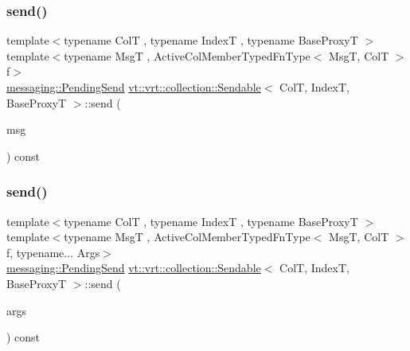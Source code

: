\mbox{\label{structvt_1_1vrt_1_1collection_1_1_sendable_aa8c102820895d01422c14e8c0993fc90}} 
\subsubsection{\texorpdfstring{send()}{send()}\hspace{0.1cm}{\footnotesize\ttfamily [2/6]}}
{\footnotesize\ttfamily template$<$typename ColT , typename IndexT , typename Base\+ProxyT $>$ \\
template$<$typename MsgT , Active\+Col\+Member\+Typed\+Fn\+Type$<$ Msg\+T, Col\+T $>$ f$>$ \\
\hyperlink{structvt_1_1messaging_1_1_pending_send}{messaging\+::\+Pending\+Send} \hyperlink{structvt_1_1vrt_1_1collection_1_1_sendable}{vt\+::vrt\+::collection\+::\+Sendable}$<$ ColT, IndexT, Base\+ProxyT $>$\+::send (\begin{DoxyParamCaption}\item[{\hyperlink{namespacevt_ab2b3d506ec8e8d1540aede826d84a239}{Msg\+Shared\+Ptr}$<$ MsgT $>$}]{msg }\end{DoxyParamCaption}) const}

\mbox{\label{structvt_1_1vrt_1_1collection_1_1_sendable_a65e5494a18b398b52f12c056cff1dc16}} 
\subsubsection{\texorpdfstring{send()}{send()}\hspace{0.1cm}{\footnotesize\ttfamily [3/6]}}
{\footnotesize\ttfamily template$<$typename ColT , typename IndexT , typename Base\+ProxyT $>$ \\
template$<$typename MsgT , Active\+Col\+Member\+Typed\+Fn\+Type$<$ Msg\+T, Col\+T $>$ f, typename... Args$>$ \\
\hyperlink{structvt_1_1messaging_1_1_pending_send}{messaging\+::\+Pending\+Send} \hyperlink{structvt_1_1vrt_1_1collection_1_1_sendable}{vt\+::vrt\+::collection\+::\+Sendable}$<$ ColT, IndexT, Base\+ProxyT $>$\+::send (\begin{DoxyParamCaption}\item[{Args \&\&...}]{args }\end{DoxyParamCaption}) const}

